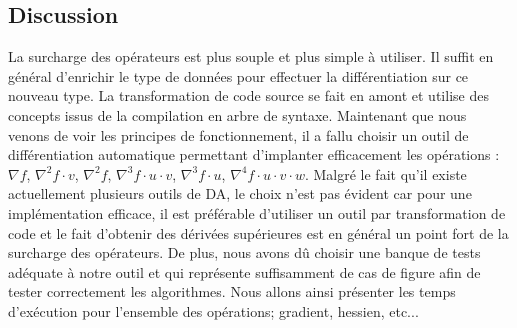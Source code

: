 \subsection{Discussion}

La surcharge des op\'erateurs est plus souple et plus simple \`a utiliser. Il suffit en g\'en\'eral d'enrichir le type de donn\'ees pour effectuer
la diff\'erentiation sur ce nouveau type. La transformation de code source se fait en amont et utilise 
des concepts issus de la compilation en arbre de syntaxe. 
Maintenant que nous venons de voir les principes de fonctionnement, il a fallu
choisir un outil de diff\'erentiation automatique permettant d'implanter 
efficacement les op\'erations : $\nabla f$, $\nabla^2 f\cdot v$, $\nabla^2 f$, $\nabla^3 f\cdot u\cdot v$, $\nabla^3 f\cdot u$, 
$\nabla^4 f\cdot u\cdot v\cdot w$. Malgr\'e le fait 
qu'il existe actuellement plusieurs outils de DA, le choix n'est pas \'evident car pour une 
impl\'ementation efficace, il est pr\'ef\'erable d'utiliser un outil par transformation de code et 
le fait d'obtenir des d\'eriv\'ees sup\'erieures est en g\'en\'eral un point fort de la surcharge des 
op\'erateurs.
De plus, nous avons dû choisir une banque de tests ad\'equate \`a notre outil et qui repr\'esente 
suffisamment de cas de figure afin de tester correctement les algorithmes. Nous allons ainsi pr\'esenter
les temps d'ex\'ecution pour l'ensemble des op\'erations; gradient, hessien, etc...







